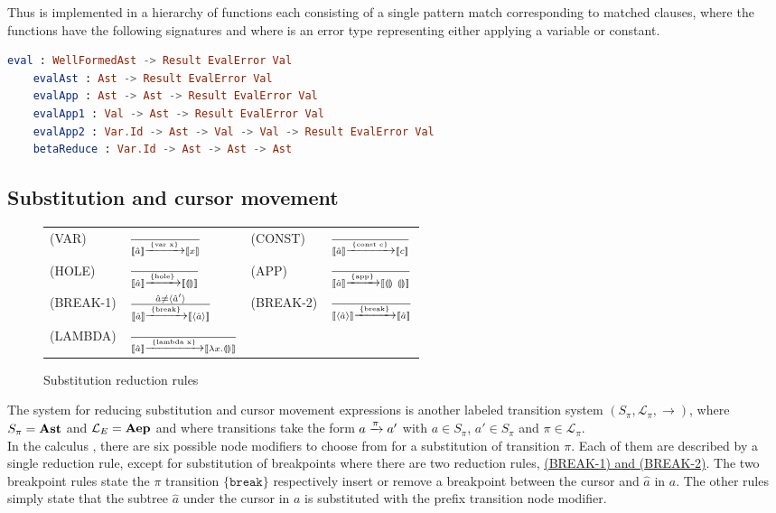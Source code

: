 Thus  is implemented in a hierarchy of functions each consisting of a
single pattern match corresponding to matched clauses, where the functions have
the following signatures and where  is an error type representing
either applying a variable or constant.

\begin{lstlisting}[language=elm,%
                   label="eval-hierarchy",%
                   gobble=4,%
                   ]
    eval : WellFormedAst -> Result EvalError Val
    evalAst : Ast -> Result EvalError Val
    evalApp : Ast -> Ast -> Result EvalError Val
    evalApp1 : Val -> Ast -> Result EvalError Val
    evalApp2 : Var.Id -> Ast -> Val -> Val -> Result EvalError Val
    betaReduce : Var.Id -> Ast -> Ast -> Ast
\end{lstlisting}


\subsection{Substitution and cursor movement}

\begin{figure*}
  \center
  \renewcommand{\arraystretch}{2}
  \begin{tabular}{llll}
    \scriptsize(VAR)     & $ \frac{} {\llbracket \hat{a} \rrbracket\xrightarrow[]{\text{\{var x\}}}\llbracket x \rrbracket} $    & \scriptsize(CONST)     & $ \frac{} {\llbracket \hat{a} \rrbracket\xrightarrow[]{\text{\{const c\}}}\llbracket c \rrbracket}$   \\
    \scriptsize(HOLE)    & $ \frac{} {\llbracket \hat{a} \rrbracket\xrightarrow[]{\text{\{hole\}}}\llbracket \llparenthesis\rrparenthesis \rrbracket} $   & \scriptsize(APP)       & $ \frac{} {\llbracket \hat{a} \rrbracket\xrightarrow[]{\text{\{app\}}}\llbracket \llparenthesis\rrparenthesis~\llparenthesis\rrparenthesis \rrbracket}$     \\
    \scriptsize(BREAK-1) & $\frac{\hat{a} \neq \langle \hat{a}' \rangle} {\llbracket \hat{a} \rrbracket\xrightarrow[]{\text{\{break\}}}\llbracket \langle \hat{a} \rangle \rrbracket}$ & \scriptsize{(BREAK-2)} & $\frac{} {\llbracket \langle \hat{a} \rangle \rrbracket\xrightarrow[]{\text{\{break\}}}\llbracket \hat{a} \rrbracket}$ \\
    \scriptsize(LAMBDA)  & $\frac{} {\llbracket \hat{a} \rrbracket\xrightarrow[]{\text{\{lambda x\}}}\llbracket \lambda x.\llparenthesis\rrparenthesis \rrbracket} $  &                        &
  \end{tabular}
  \caption{Substitution reduction rules}
  \label{fig:substitutionreductionrules}
\end{figure*}

The system for reducing substitution and cursor movement expressions is another
labeled transition system $(S_{\pi}, \mathcal{L}_{\pi}, \to)$, where $S_{\pi}
= \textbf{Ast}$ and $\mathcal{L}_E = \textbf{Aep}$ and where transitions take the form $a
\xrightarrow[]{\text{$\pi$}} a'$ with $a \in S_{\pi}$, $a' \in S_{\pi}$ and $\pi \in
\mathcal{L}_{\pi}$. \\

In the calculus \pepm, there are six possible node modifiers to choose from for
a substitution of transition $\pi$. Each of them are described by a single
reduction rule, except for substitution of breakpoints where there are two
reduction rules, \hyperref[fig:substitutionreductionrules]{(BREAK-1) and
(BREAK-2)}. The two breakpoint rules state the $\pi$ transition
$\{\texttt{break}\}$ respectively insert or remove a breakpoint between the
cursor and $\hat{a}$ in $a$. The other rules simply state that the subtree
$\hat{a}$ under the cursor in $a$ is substituted with the prefix transition
node modifier.

